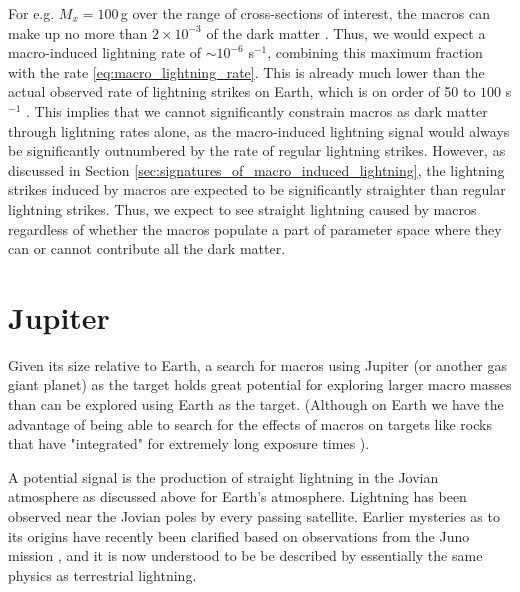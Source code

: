 \documentclass[%
 reprint,
 amsmath,amssymb,
 aps,
]{revtex4-2}
\begin{document}
        For e.g. $M_x = 100\,$g over the range of cross-sections of interest, the macros can make up no more than $2\times 10^{-3}$ of the dark matter \cite{Sidhu2019death}. Thus, we would expect a macro-induced lightning rate of $\sim 10^{-6}$ s$^{-1}$, combining this maximum fraction with the rate \eqref{eq:macro_lightning_rate}. This is already much lower than the actual observed rate of lightning strikes on Earth, which is on order of 50 to $100$ s$^{-1}$ \citep{Mackerras1998}. This implies that we cannot significantly constrain macros as dark matter through lightning rates alone, as the macro-induced lightning signal would always be significantly outnumbered by the rate of regular lightning strikes. However, as discussed in Section \ref{sec:signatures_of_macro_induced_lightning}, the lightning strikes induced by macros are expected to be significantly straighter than regular lightning strikes. Thus, we expect to see straight lightning caused by macros regardless of whether the macros populate a part of parameter space where they can or cannot contribute all the dark matter.

    


\section{Jupiter} %
\label{sec:jovian_bolides}

    Given its size relative to Earth, a search for macros using Jupiter (or another gas giant planet) as the target  holds great potential for  exploring larger macro masses than can be explored using Earth as the target.  (Although on Earth we have the advantage of being able to search for the effects of macros on targets like rocks that have "integrated" for extremely long exposure times \cite{Sidhu2019granite}). 

    A potential signal is the production of straight lightning in the Jovian atmosphere as discussed above for Earth's atmosphere. Lightning has been observed near the Jovian poles by every passing satellite. Earlier mysteries as to its origins have recently been clarified based on observations from the Juno mission \cite{Brown2018}, and it is now understood to be be described by essentially the same physics as terrestrial lightning.
\end{document}

